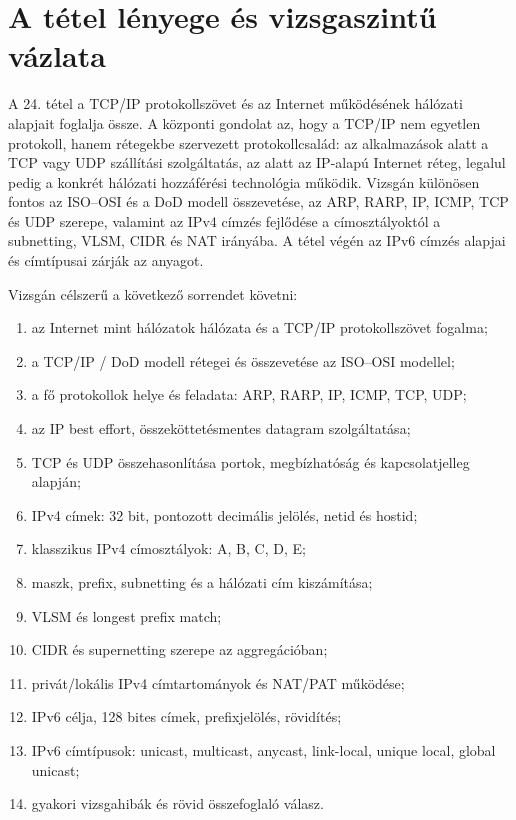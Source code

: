 \section{A tétel lényege és vizsgaszintű vázlata}

\begin{summarybox}
A 24. tétel a TCP/IP protokollszövet és az Internet működésének hálózati alapjait foglalja össze. A központi gondolat az, hogy a TCP/IP nem egyetlen protokoll, hanem rétegekbe szervezett protokollcsalád: az alkalmazások alatt a TCP vagy UDP szállítási szolgáltatás, az alatt az IP-alapú Internet réteg, legalul pedig a konkrét hálózati hozzáférési technológia működik. Vizsgán különösen fontos az ISO--OSI és a DoD modell összevetése, az ARP, RARP, IP, ICMP, TCP és UDP szerepe, valamint az IPv4 címzés fejlődése a címosztályoktól a subnetting, VLSM, CIDR és NAT irányába. A tétel végén az IPv6 címzés alapjai és címtípusai zárják az anyagot.
\end{summarybox}

Vizsgán célszerű a következő sorrendet követni:

\begin{enumerate}
  \item az Internet mint hálózatok hálózata és a TCP/IP protokollszövet fogalma;
  \item a TCP/IP / DoD modell rétegei és összevetése az ISO--OSI modellel;
  \item a fő protokollok helye és feladata: ARP, RARP, IP, ICMP, TCP, UDP;
  \item az IP best effort, összeköttetésmentes datagram szolgáltatása;
  \item TCP és UDP összehasonlítása portok, megbízhatóság és kapcsolatjelleg alapján;
  \item IPv4 címek: 32 bit, pontozott decimális jelölés, netid és hostid;
  \item klasszikus IPv4 címosztályok: A, B, C, D, E;
  \item maszk, prefix, subnetting és a hálózati cím kiszámítása;
  \item VLSM és longest prefix match;
  \item CIDR és supernetting szerepe az aggregációban;
  \item privát/lokális IPv4 címtartományok és NAT/PAT működése;
  \item IPv6 célja, 128 bites címek, prefixjelölés, rövidítés;
  \item IPv6 címtípusok: unicast, multicast, anycast, link-local, unique local, global unicast;
  \item gyakori vizsgahibák és rövid összefoglaló válasz.
\end{enumerate}

